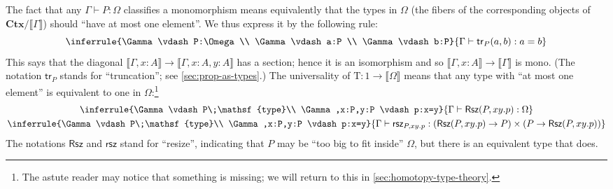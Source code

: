 \documentclass[10pt]{article}
\def\ty{\;\mathsf{type}}
\def\m#1{\llbracket#1\rrbracket}
\def\types{\vdash}
\def\true{\mathrm{T}}
\def\Ctx{\mathbf{Ctx}}
\numberwithin{equation}{section}
\begin{document}
The fact that any $\Gamma \types P:\Omega$ classifies a monomorphism means equivalently that the types in $\Omega$ (the fibers of the corresponding objects of $\Ctx/\m\Gamma$) should ``have at most one element''.
We thus express it by the following rule:
\begin{equation}
  \label{eq:omega-hprop}
  \inferrule{\Gamma\types P:\Omega \\ \Gamma \types a:P \\ \Gamma \types b:P}{\Gamma\types \mathsf{tr}_P(a,b) : a=b}
\end{equation}
This says that the diagonal $\m{\Gamma,x:A} \to \m{\Gamma,x:A,y:A}$ has a section; hence it is an isomorphism and so $\m{\Gamma,x:A} \to \m{\Gamma}$ is mono.
(The notation $\mathsf{tr}_P$ stands for ``truncation''; see \cref{sec:prop-as-types}.)
The universality of $\true:1\to \m\Omega$ means that any type with ``at most one element'' is equivalent to one in $\Omega$:\footnote{The astute reader may notice that something is missing; we will return to this in \cref{sec:homotopy-type-theory}.}
\begin{gather}
  \label{eq:omega-classif}
  \inferrule{\Gamma\types P\ty \\ \Gamma,x:P,y:P \types p:x=y}
  {\Gamma \types \mathsf{Rsz}(P,xy.p):\Omega } %
  \\
  \inferrule{\Gamma\types P\ty \\ \Gamma,x:P,y:P \types p:x=y}{\Gamma\types \mathsf{rsz}_{P,xy.p} :
    (\mathsf{Rsz}(P,xy.p) \to P)\times (P\to \mathsf{Rsz}(P,xy.p))}
\end{gather}
The notations $\mathsf{Rsz}$ and $\mathsf{rsz}$ stand for ``resize'', indicating that $P$ may be ``too big to fit inside'' $\Omega$, but there is an equivalent type that does.
\end{document}
